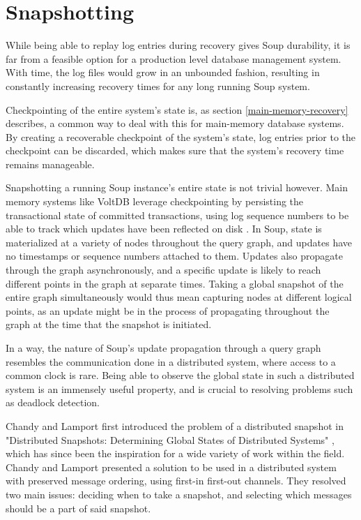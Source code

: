 \documentclass[b5paper]{report}
\begin{document}
\section{Snapshotting}
While being able to replay log entries during recovery
gives Soup durability, it is far from a feasible option for a production level
database management system. With time, the log files would grow in an unbounded
fashion, resulting in constantly increasing recovery times for any long running
Soup system.

Checkpointing of the entire system's state is, as section
\ref{main-memory-recovery} describes, a common way to deal with this for
main-memory database systems. By creating a recoverable checkpoint of the
system's state, log entries prior to the checkpoint can be discarded, which
makes sure that the system's recovery time remains manageable.

Snapshotting a running Soup instance's entire state is not trivial however.
Main memory systems like VoltDB leverage checkpointing by persisting the
transactional state of committed transactions, using log sequence numbers to be
able to track which updates have been reflected on disk \cite{voltdb-recovery}.
In Soup, state is materialized at a variety of nodes throughout the query graph,
and updates have no timestamps or sequence numbers attached to them. Updates
also propagate through the graph asynchronously, and a specific update is likely
to reach different points in the graph at separate times. Taking a global
snapshot of the entire graph simultaneously would thus mean capturing nodes at
different logical points, as an update might be in the process of propagating
throughout the graph at the time that the snapshot is initiated.

In a way, the nature of Soup's update propagation through a query graph
resembles the communication done in a distributed system, where access to a
common clock is rare. Being able to observe the global state in such a
distributed system is an immensely useful property, and is crucial to resolving
problems such as deadlock detection.

Chandy and Lamport first introduced the problem of a distributed snapshot in
"Distributed Snapshots: Determining Global States of Distributed Systems"
\cite{chandy-lamport}, which has since been the inspiration for a wide variety
of work within the field. Chandy and Lamport presented a solution to be used in
a distributed system with preserved message ordering, using first-in first-out
channels. They resolved two main issues: deciding when to take a snapshot, and
selecting which messages should be a part of said snapshot.
\end{document}
